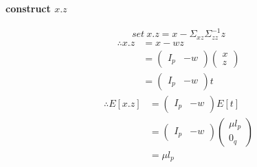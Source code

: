 \documentclass{report}
\begin{document}
\paragraph{construct $x.z$\\}
$$set\ x.z = x - \Sigma_{xz} \Sigma_{zz}^{-1}z$$
\begin{equation}
\begin{aligned}
\therefore x.z &= x - wz\\
&=
\left (
\begin{matrix}
I_p & -w
\end{matrix}
\right )
\left (
\begin{matrix}
x \\
z
\end{matrix}
\right )\\
&=\left (
\begin{matrix}
I_p & -w
\end{matrix}
\right )
t
\end{aligned}
\end{equation}
\begin{equation}
\begin{aligned}
\therefore 
E[x.z]&=
\left (
\begin{matrix}
I_p & -w
\end{matrix}
\right ) E[t]\\
&= 
\left (
\begin{matrix}
I_p & -w
\end{matrix}
\right )
\left (
\begin{matrix}
\mu l_p\\
0_q
\end{matrix}
\right )\\
&=\mu l_p
\end{aligned}
\end{equation}
\end{document}
